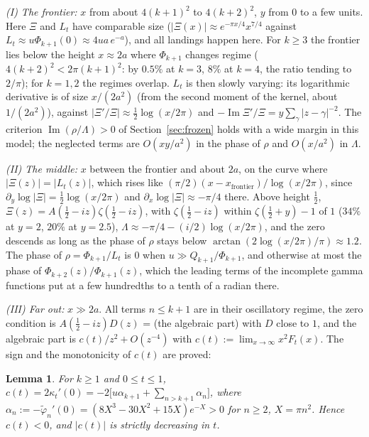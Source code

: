 \documentclass[11pt]{article}
\theoremstyle{plain}
\newtheorem{lemma}[theorem]{Lemma}
\theoremstyle{definition}
\theoremstyle{remark}
\newcommand{\im}{\operatorname{Im}}
\newcommand{\tphi}{\widetilde{\varphi}}
\begin{document}
\emph{(I) The frontier:} $x$ from about $4(k+1)^2$ to $4(k+2)^2$, $y$ from $0$
to a few units. Here $\Xi$ and $L_t$ have comparable size
($|\Xi(x)| \approx e^{-\pi x/4}x^{7/4}$ against
$L_t \approx u\Phi_{k+1}(0) \approx 4ua\,e^{-a}$), and all landings happen
here. For $k \ge 3$ the frontier lies below the height $x \approx 2a$ where
$\Phi_{k+1}$ changes regime ($4(k+2)^2 < 2\pi(k+1)^2$: by $0.5\%$ at $k = 3$,
$8\%$ at $k = 4$, the ratio tending to $2/\pi$); for $k = 1, 2$ the regimes
overlap. $L_t$ is then slowly varying: its logarithmic derivative is of size
$x/(2a^2)$ (from the second moment of the kernel, about $1/(2a^2)$), against
$|\Xi'/\Xi| \approx \frac12\log(x/2\pi)$ and
$-\im\Xi'/\Xi = y\sum_\gamma|z - \gamma|^{-2}$. The criterion
$\im(\rho/\Lambda) > 0$ of Section~\ref{sec:frozen} holds with a wide margin in
this model; the neglected terms are $O(xy/a^2)$ in the phase of $\rho$ and
$O(x/a^2)$ in $\Lambda$.

\emph{(II) The middle:} $x$ between the frontier and about $2a$, on the curve
where $|\Xi(z)| = |L_t(z)|$, which rises like
$(\pi/2)(x - x_{\mathrm{frontier}})/\log(x/2\pi)$, since
$\partial_y\log|\Xi| = \frac12\log(x/2\pi)$ and
$\partial_x\log|\Xi| \approx -\pi/4$ there. Above height $\frac12$,
$\Xi(z) = A(\frac12 - iz)\zeta(\frac12 - iz)$, with $\zeta(\frac12 - iz)$
within $\zeta(\frac12 + y) - 1$ of $1$ ($34\%$ at $y = 2$, $20\%$ at
$y = 2.5$), $\Lambda \approx -\pi/4 - (i/2)\log(x/2\pi)$, and the zero
descends as long as the phase of $\rho$ stays below
$\arctan(2\log(x/2\pi)/\pi) \approx 1.2$. The phase of
$\rho = \Phi_{k+1}/L_t$ is $0$ when $u \gg Q_{k+1}/\Phi_{k+1}$, and otherwise
at most the phase of $\Phi_{k+2}(z)/\Phi_{k+1}(z)$, which the leading terms of
the incomplete gamma functions put at a few hundredths to a tenth of a radian
there.

\emph{(III) Far out:} $x \gg 2a$. All terms $n \le k+1$ are in their
oscillatory regime, the zero condition is $A(\frac12 - iz)D(z)$ = (the
algebraic part) with $D$ close to $1$, and the algebraic part is
$c(t)/z^2 + O(z^{-4})$ with $c(t) := \lim_{x\to\infty}x^2F_t(x)$. The sign and
the monotonicity of $c(t)$ are proved:

\begin{lemma}\label{lem:ct}
For $k \ge 1$ and $0 \le t \le 1$,
$c(t) = 2\kappa_t'(0) = -2\bigl[u\alpha_{k+1} + \sum_{n > k+1}\alpha_n\bigr]$,
where $\alpha_n := -\tphi_n'(0) = (8X^3 - 30X^2 + 15X)e^{-X} > 0$ for $n \ge 2$,
$X = \pi n^2$. Hence $c(t) < 0$, and $|c(t)|$ is strictly decreasing in $t$.
\end{lemma}
\end{document}
